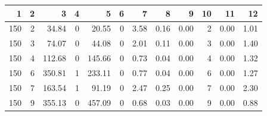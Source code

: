 \begin{tabular}{rrrrrrrrrrrr}
\toprule
1 & 2 & 3 & 4 & 5 & 6 & 7 & 8 & 9 & 10 & 11 & 12 \\
\midrule
150 & 2 & 34.84 & 0 & 20.55 & 0 & 3.58 & 0.16 & 0.00 & 2 & 0.00 & 1.01 \\
150 & 3 & 74.07 & 0 & 44.08 & 0 & 2.01 & 0.11 & 0.00 & 3 & 0.00 & 1.40 \\
150 & 4 & 112.68 & 0 & 145.66 & 0 & 0.73 & 0.04 & 0.00 & 4 & 0.00 & 1.32 \\
150 & 6 & 350.81 & 1 & 233.11 & 0 & 0.77 & 0.04 & 0.00 & 6 & 0.00 & 1.27 \\
150 & 7 & 163.54 & 1 & 91.19 & 0 & 2.47 & 0.25 & 0.00 & 7 & 0.00 & 2.30 \\
150 & 9 & 355.13 & 0 & 457.09 & 0 & 0.68 & 0.03 & 0.00 & 9 & 0.00 & 0.88 \\
\bottomrule
\end{tabular}
